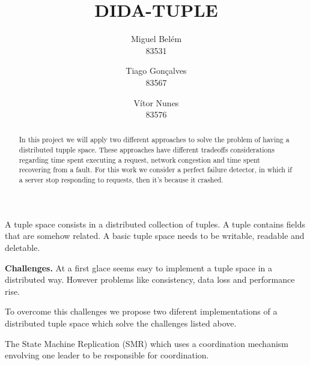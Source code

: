 \documentclass[times, 10pt,twocolumn]{article}
\begin{document}
\title{DIDA-TUPLE}

\author{Miguel Belém\\
83531\\
\and
Tiago Gonçalves\\
83567\\
\and
Vítor Nunes\\
83576\\
}

\maketitle
\thispagestyle{empty}

\begin{abstract}
   In this project we will apply two different approaches to solve the problem of
   having a distributed tupple space. 
   These approaches have different tradeoffs considerations regarding time spent 
   executing a request, network congestion and time spent recovering from a fault.
   For this work we consider a perfect failure detector, in which if a server stop
   responding to requests, then it's because it crashed.   
\end{abstract}




A tuple space consists in a distributed collection of tuples. A tuple contains
fields that are somehow related.
A basic tuple space needs to be writable, readable and deletable.

\textbf{Challenges.} At a first glace seems easy to implement a tuple space
in a distributed way. However problems like consistency, data loss and 
performance rise.

To overcome this challenges we propose two diferent implementations of a 
distributed tuple space which solve the challenges listed above.

The State Machine Replication (SMR) which uses a coordination mechanism envolving
one leader to be responsible for coordination.
\end{document}
